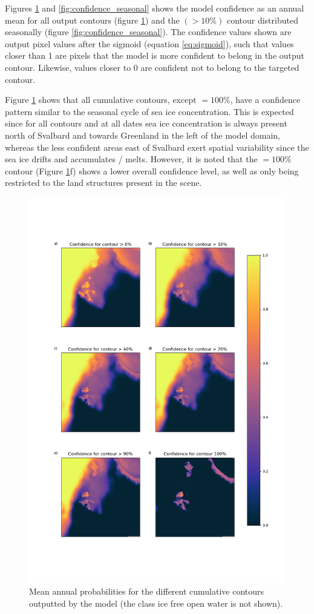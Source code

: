 \documentclass[../main/thesis.tex]{subfiles}
\begin{document}
Figures \ref{fig:mean_annual_confidence} and \ref{fig:confidence_seasonal} shows the model confidence as an annual mean for all output contours (figure \ref{fig:mean_annual_confidence}) and the $(> 10\%)$ contour distributed seasonally (figure \ref{fig:confidence_seasonal}). The confidence values shown are output pixel values after the sigmoid (equation \ref{eq:sigmoid}), such that values closer than 1 are pixels that the model is more confident to belong in the output contour. Likewise, values closer to 0 are confident not to belong to the targeted contour.

Figure \ref{fig:mean_annual_confidence} shows that all cumulative contours, except $=100\%$, have a confidence pattern similar to the seasonal cycle of sea ice concentration. This is expected since for all contours and at all dates sea ice concentration is always present north of Svalbard and towards Greenland in the left of the model domain, whereas the less confident areas east of Svalbard exert spatial variability since the sea ice drifts and accumulates / melts. However, it is noted that the $=100\%$ contour (Figure \ref{fig:mean_annual_confidence}f) shows a lower overall confidence level, as well as only being restricted to the land structures present in the scene.

\begin{figure}
    \centering
    \includegraphics[width=.8\textwidth]{confidence_mean_annual}
    \caption{\label{fig:mean_annual_confidence}Mean annual probabilities for the different cumulative contours outputted by the model (the class ice free open water is not shown).}
\end{figure}
\end{document}
